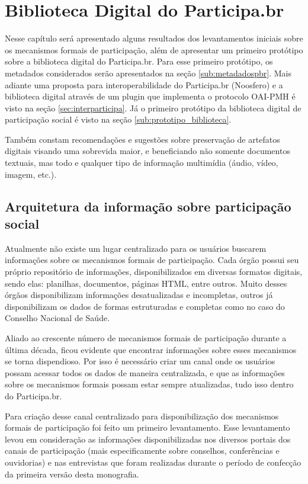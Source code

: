 \chapter{Biblioteca Digital do Participa.br}
\label{cap:bibparticipabr}

Nesse capítulo será apresentado alguns resultados dos levantamentos iniciais sobre os mecanismos formais de participação, além de apresentar um primeiro protótipo sobre a biblioteca digital do Participa.br. Para esse primeiro protótipo, os metadados considerados serão apresentados na seção \ref{sub:metadadospbr}. Mais adiante uma proposta para interoperabilidade do Participa.br (Noosfero) e a biblioteca digital através de um plugin que implementa o protocolo OAI-PMH é visto na seção \ref{sec:interparticipa}. Já o primeiro protótipo da biblioteca digital de participação social é visto na seção \ref{sub:prototipo_biblioteca}.

Também constam recomendações e sugestões sobre preservação de artefatos digitais visando uma sobrevida maior, e beneficiando não somente documentos textuais, mas todo e qualquer tipo de informação multimídia (áudio, vídeo, imagem, etc.).

\section{Arquitetura da informação sobre participação social}

Atualmente não existe um lugar centralizado para os usuários buscarem informações sobre os mecanismos formais de participação. Cada órgão possui seu próprio repositório de informações, disponibilizados em diversas formatos digitais, sendo elas: planilhas, documentos, páginas HTML, entre outros. Muito desses órgãos disponibilizam informações desatualizadas e incompletas, outros já disponibilizam os dados de formas estruturadas e completas como no caso do Conselho Nacional de Saúde. 

Aliado ao crescente número de mecanismos formais de participação durante a última década, ficou evidente que encontrar informações sobre esses mecanismos se torna dispendioso. Por isso é necessário criar um canal onde os usuários possam acessar todos os dados de maneira centralizada, e que as informações sobre os mecanismos formais possam estar sempre atualizadas, tudo isso dentro do Participa.br.

Para criação desse canal centralizado para disponibilização dos mecanismos formais de participação foi feito um primeiro levantamento. Esse levantamento levou em consideração as informações disponibilizadas nos diversos portais dos canais de participação (mais especificamente sobre conselhos, conferências e ouvidorias) e nas entrevistas que foram realizadas durante o período de confecção da primeira versão desta monografia.

